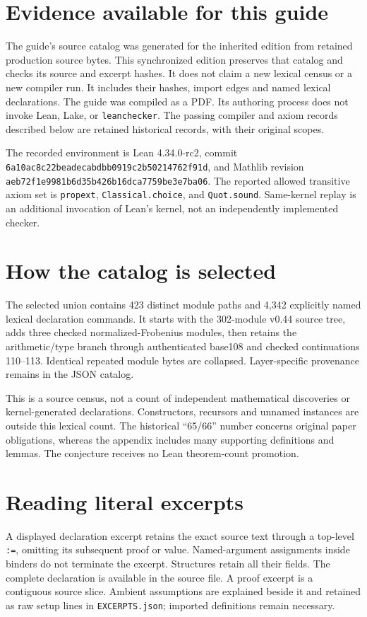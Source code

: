 \documentclass[10pt,oneside]{book}
\begin{document}
\section{Evidence available for this guide}
The guide's source catalog was generated for the inherited edition from retained production source bytes. This synchronized edition preserves that catalog and checks its source and excerpt hashes. It does not claim a new lexical census or a new compiler run. It includes their hashes, import edges and named lexical declarations. The guide was compiled as a PDF. Its authoring process does not invoke Lean, Lake, or \texttt{leanchecker}. The passing compiler and axiom records described below are retained historical records, with their original scopes.

The recorded environment is Lean 4.34.0-rc2, commit \nolinkurl{6a10ac8c22beadecabdbb0919c2b50214762f91d}, and Mathlib revision \nolinkurl{aeb72f1e9981b6d35b426b16dca7759be3e7ba06}. The reported allowed transitive axiom set is \texttt{propext}, \texttt{Classical.choice}, and \texttt{Quot.sound}. Same-kernel replay is an additional invocation of Lean's kernel, not an independently implemented checker.

\section{How the catalog is selected}
The selected union contains 423 distinct module paths and 4,342 explicitly named lexical declaration commands. It starts with the 302-module v0.44 source tree, adds three checked normalized-Frobenius modules, then retains the arithmetic/type branch through authenticated base108 and checked continuations 110--113. Identical repeated module bytes are collapsed. Layer-specific provenance remains in the JSON catalog.

This is a source census, not a count of independent mathematical discoveries or kernel-generated declarations. Constructors, recursors and unnamed instances are outside this lexical count. The historical ``65/66'' number concerns original paper obligations, whereas the appendix includes many supporting definitions and lemmas. The conjecture receives no Lean theorem-count promotion.

\section{Reading literal excerpts}
A displayed declaration excerpt retains the exact source text through a top-level \texttt{:=}, omitting its subsequent proof or value. Named-argument assignments inside binders do not terminate the excerpt. Structures retain all their fields. The complete declaration is available in the source file. A proof excerpt is a contiguous source slice. Ambient assumptions are explained beside it and retained as raw setup lines in \texttt{EXCERPTS.json}; imported definitions remain necessary.
\end{document}
